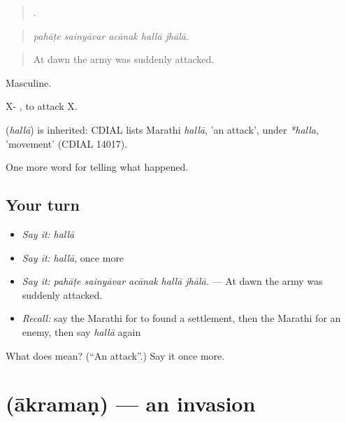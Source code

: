 \begin{quote}
    .
\end{quote}

\begin{quote}
\emph{pahāṭe sainyāvar acānak hallā jhālā.}
\end{quote}

\begin{quote}
At dawn the army was suddenly attacked.
\end{quote}

Masculine.

X-  , to attack X.

\begin{cousinweb}
\textbf{} (\emph{hallā}) is inherited: CDIAL lists Marathi \emph{hallā}, 'an attack', under \emph{*halla}, 'movement' (CDIAL 14017).
\end{cousinweb}

\begin{grammarlens}[title={What you've built}]
One more word for telling what happened.
\end{grammarlens}

\subsection*{Your turn}
\begin{itemize}
\raggedright
  \item \emph{Say it:} \emph{hallā}
  \item \emph{Say it:} \emph{hallā}, once more
  \item \emph{Say it:} \emph{pahāṭe sainyāvar acānak hallā jhālā.} — At dawn the army was suddenly attacked.
  \item \emph{Recall:} say the Marathi for to found a settlement, then the Marathi for an enemy, then say \emph{hallā} again
\end{itemize}

\begin{tcolorbox}[breakable,colback=teal!4,colframe=teal!35!black,title={Before you move on}]
What does  mean? (\textquotedblleft{}An attack\textquotedblright{}.) Say it once more.
\end{tcolorbox}
\section[\texorpdfstring{\mr{आक्रमण} (ākramaṇ)}{आक्रमण (ākramaṇ)}]{ (ākramaṇ) — an invasion}

